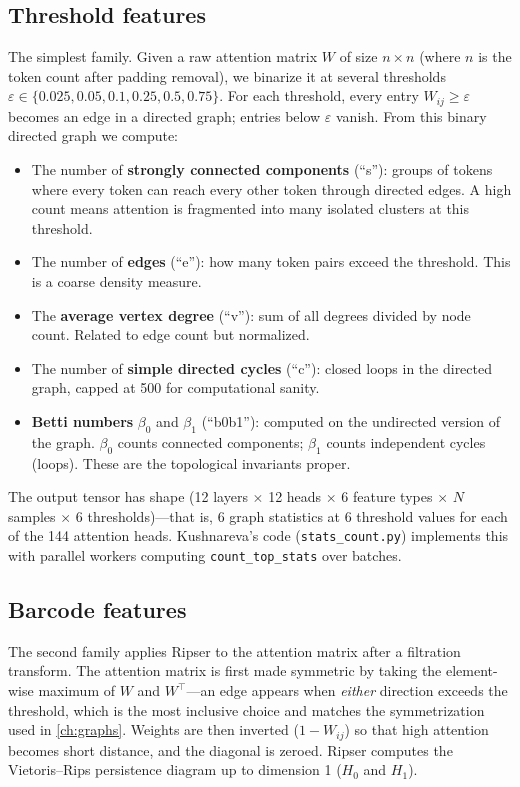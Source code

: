 \subsection{Threshold features}

The simplest family. Given a raw attention matrix $W$ of size $n \times n$ (where $n$ is the token count after padding removal), we binarize it at several thresholds $\varepsilon \in \{0.025, 0.05, 0.1, 0.25, 0.5, 0.75\}$. For each threshold, every entry $W_{ij} \geq \varepsilon$ becomes an edge in a directed graph; entries below $\varepsilon$ vanish. From this binary directed graph we compute:

\begin{itemize}
  \item The number of \textbf{strongly connected components} (``s''): groups of tokens where every token can reach every other token through directed edges. A high count means attention is fragmented into many isolated clusters at this threshold.
  \item The number of \textbf{edges} (``e''): how many token pairs exceed the threshold. This is a coarse density measure.
  \item The \textbf{average vertex degree} (``v''): sum of all degrees divided by node count. Related to edge count but normalized.
  \item The number of \textbf{simple directed cycles} (``c''): closed loops in the directed graph, capped at 500 for computational sanity.
  \item \textbf{Betti numbers} $\beta_0$ and $\beta_1$ (``b0b1''): computed on the undirected version of the graph. $\beta_0$ counts connected components; $\beta_1$ counts independent cycles (loops). These are the topological invariants proper.
\end{itemize}

The output tensor has shape (12 layers $\times$ 12 heads $\times$ 6 feature types $\times$ $N$ samples $\times$ 6 thresholds)---that is, 6 graph statistics at 6 threshold values for each of the 144 attention heads. Kushnareva's code (\texttt{stats\_count.py}) implements this with parallel workers computing \texttt{count\_top\_stats} over batches.

\subsection{Barcode features}

The second family applies Ripser \parencite{bauer2021} to the attention matrix after a filtration transform. The attention matrix is first made symmetric by taking the element-wise maximum of $W$ and $W^\top$---an edge appears when \emph{either} direction exceeds the threshold, which is the most inclusive choice and matches the symmetrization used in \autoref{ch:graphs}. Weights are then inverted ($1 - W_{ij}$) so that high attention becomes short distance, and the diagonal is zeroed. Ripser computes the Vietoris--Rips persistence diagram up to dimension 1 ($H_0$ and $H_1$).

